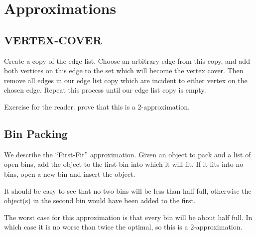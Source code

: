 \chapter{Approximations}

\section{VERTEX-COVER}

Create a copy of the edge list.  Choose an arbitrary edge from this
copy, and add both vertices on this edge to the set which will become
the vertex cover.  Then remove all edges in our edge list copy which
are incident to either vertex on the chosen edge.  Repeat this process
until our edge list copy is empty.

Exercise for the reader: prove that this is a 2-approximation.

\section{Bin Packing}

We describe the ``First-Fit'' approximation.  Given an object to pack
and a list of open bins, add the object to the first bin into which it
will fit.  If it fits into no bins, open a new bin and insert the object.

It should be easy to see that no two bins will be less than half full,
otherwise the object(s) in the second bin would have been added to the
first.

The worst case for this approximation is that every bin will be about
half full.  In which case it is no worse than twice the optimal, so
this is a 2-approximation.
